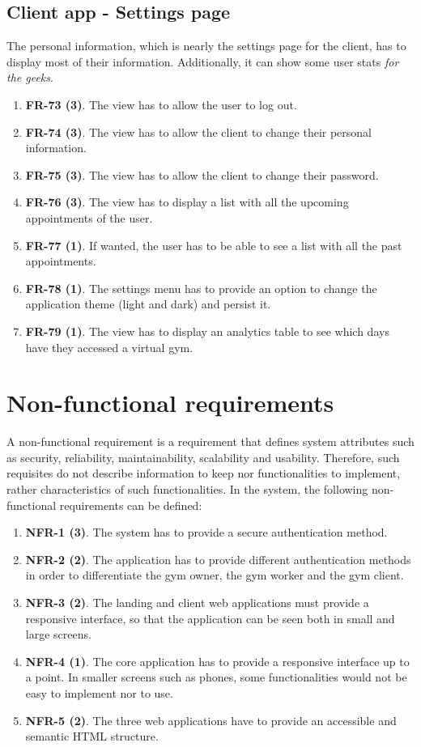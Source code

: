 \documentclass[a4paper, 12pt, oneside]{book}
\begin{document}
\subsection{Client app - Settings page}
The personal information, which is nearly the settings page for the client, has to display most of their information. Additionally, it can show some user stats \emph{for the geeks}.
\begin{enumerate}[label = -]
	\item \textbf{FR-73 (3)}. The view has to allow the user to log out.
	\item \textbf{FR-74 (3)}. The view has to allow the client to change their personal information.
	\item \textbf{FR-75 (3)}. The view has to allow the client to change their password.
	\item \textbf{FR-76 (3)}. The view has to display a list with all the upcoming appointments of the user.
	\item \textbf{FR-77 (1)}. If wanted, the user has to be able to see a list with all the past appointments.
	\item \textbf{FR-78 (1)}. The settings menu has to provide an option to change the application theme (light and dark) and persist it.
	\item \textbf{FR-79 (1)}. The view has to display an analytics table to see which days have they accessed a virtual gym.
\end{enumerate}
\section{Non-functional requirements}
A non-functional requirement is a requirement that defines system attributes such as security, reliability, maintainability, scalability and usability. Therefore, such requisites do not describe information to keep nor functionalities to implement, rather characteristics of such functionalities. In the system, the following non-functional requirements can be defined:
\begin{enumerate}[label = -]
	\item \textbf{NFR-1 (3)}. The system has to provide a secure authentication method.
	\item \textbf{NFR-2 (2)}. The application has to provide different authentication methods in order to differentiate the gym owner, the gym worker and the gym client.
	\item \textbf{NFR-3 (2)}. The landing and client web applications must provide a responsive interface, so that the application can be seen both in small and large screens.
	\item \textbf{NFR-4 (1)}. The core application has to provide a responsive interface up to a point. In smaller screens such as phones, some functionalities would not be easy to implement nor to use.
	\item \textbf{NFR-5 (2)}. The three web applications have to provide an accessible and semantic HTML structure.
\end{enumerate}
\end{document}
